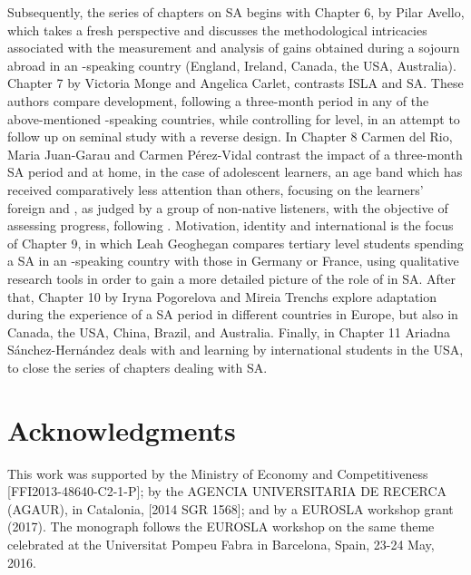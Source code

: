 \documentclass[output=paper]{langsci/langscibook}
\begin{document}
\largerpage
Subsequently, the series of chapters on SA begins with Chapter 6, by Pilar Avello, which takes a fresh perspective and discusses the methodological intricacies associated with the measurement and analysis of  gains obtained during a sojourn abroad in an -speaking country (England, Ireland, Canada, the USA, Australia). Chapter 7 by Victoria Monge and Angelica Carlet, contrasts ISLA and SA. These authors compare   development, following a three-month period in any of the above-mentioned -speaking countries, while controlling for  level, in an attempt to follow up on  seminal study with a reverse design. In Chapter 8 Carmen del Rio, Maria Juan-Garau and Carmen Pérez-Vidal contrast the impact of a three-month SA period and  at home, in the case of adolescent  learners, an age band which has received comparatively less attention than others, focusing on the learners’ foreign  and , as judged by a group of non-native listeners, with the objective of assessing progress, following \citet{TrofimovichIsaacs2012}. {Motivation, identity and international  is the focus of Chapter 9, in which Leah Geoghegan compares tertiary level students spending a SA in an -speaking country with those in Germany or France, using qualitative research tools in order to gain a more detailed picture of the role of  in SA. After that, Chapter 10 by Iryna Pogorelova and Mireia Trenchs explore}  adaptation during the experience of a SA period in different countries in Europe, but also in Canada, the USA, China, Brazil, and Australia. Finally, in Chapter 11 Ariadna Sánchez-Hernández deals with  and  learning by international students in the USA, to close the series of chapters dealing with SA. 


\section*{Acknowledgments}
This work was supported
by the Ministry of Economy and Competitiveness [FFI{\linebreak}2013-48640-C2-1-P];
by the AGENCIA UNIVERSITARIA DE RECERCA (AGAUR), in Catalonia, [2014 SGR 1568]; 
and by a EUROSLA workshop grant (2017).   The monograph follows the EUROSLA workshop on the same theme celebrated at the Universitat Pompeu Fabra in Barcelona, Spain, 23-24 May, 2016.
 
 
\sloppy
\printbibliography[heading=subbibliography,notkeyword=this] 
\end{document}
